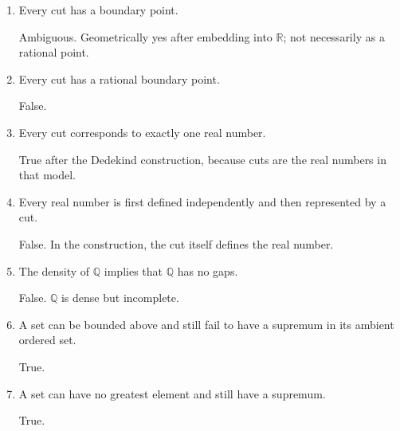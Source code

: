 \documentclass{self-check}
\begin{document}
\begin{enumerate}[label=\arabic*., itemsep=10pt]
\begin{answer}
True after $\mathbb{R}$ has been constructed and proved complete.
\end{answer}

\item Every cut has a boundary point.

\begin{answer}
Ambiguous. Geometrically yes after embedding into $\mathbb{R}$; not necessarily as a rational point.
\end{answer}

\item Every cut has a rational boundary point.

\begin{answer}
False.
\end{answer}

\item Every cut corresponds to exactly one real number.

\begin{answer}
True after the Dedekind construction, because cuts are the real numbers in that model.
\end{answer}

\item Every real number is first defined independently and then represented by a cut.

\begin{answer}
False. In the construction, the cut itself defines the real number.
\end{answer}

\item The density of $\mathbb{Q}$ implies that $\mathbb{Q}$ has no gaps.

\begin{answer}
False. $\mathbb{Q}$ is dense but incomplete.
\end{answer}

\item A set can be bounded above and still fail to have a supremum in its ambient ordered set.

\begin{answer}
True.
\end{answer}

\item A set can have no greatest element and still have a supremum.

\begin{answer}
True.
\end{answer}


\end{enumerate}
\end{document}
